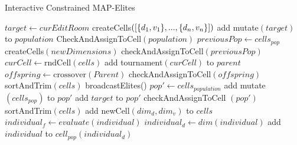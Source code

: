\begin{algorithm}
\footnotesize
\caption{Interactive Constrained MAP-Elites}\label{alg:ICMAPE}
\begin{algorithmic}[1]
\State $target \gets curEditRoom$ 
\State createCells$(\protect[\{d_1,v_1\},...,\{d_n,v_n\}])$
     \State add mutate$(target)$ to $population$
\EndFor
\State CheckAndAssignToCell$(population)$ 
 
            \State $previousPop \gets cells_{pop}$
            \State createCells$(newDimensions)$
            \State checkAndAssignToCell$(previousPop)$ 
        \EndIf
                \State $curCell \gets \text{rndCell}(cells)$
                \State add tournament$(curCell)$ to $parent$
            \EndFor
            \State $offspring \gets  \text{crossover}(Parent)$
            \State checkAndAssignToCell$(offspring)$
        \EndRepeat
        \State sortAndTrim$(cells)$
    \EndFor
    \State broadcastElites() 
    \State $pop' \gets cells_{population}$
    \State add mutate$(cells_{pop})$ to $pop'$
    \State add $target$ to $pop'$
    \State checkAndAssignToCell $(pop')$
    \State sortAndTrim$(cells)$
\EndWhile
\EndProcedure
{}
        \State add newCell$(dim_d, dim_v)$ to $cells$
    \EndFor
\EndProcedure
{}
        \State $individual_f \gets evaluate(individual)$ 
        \State $individual_d \gets dim(individual)$
        \State add $individual$ to $cell_{pop}(individual_d)$
    \EndFor
\EndProcedure
\end{algorithmic}
\end{algorithm}

